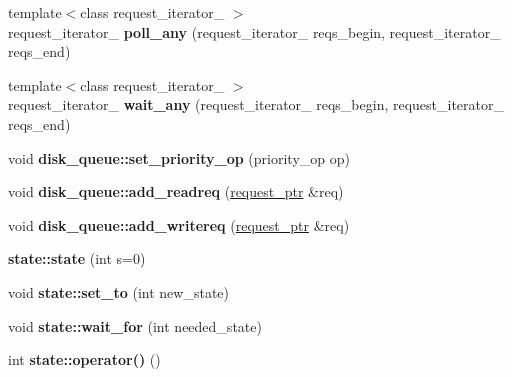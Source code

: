 \begin{CompactItemize}
\item 
\hypertarget{group__iolayer_g825e2ba95dc73579da11f2e1a86943fd}{
{\footnotesize template$<$class request\_\-iterator\_\- $>$ }\\request\_\-iterator\_\- \textbf{poll\_\-any} (request\_\-iterator\_\- reqs\_\-begin, request\_\-iterator\_\- reqs\_\-end)}
\label{group__iolayer_g825e2ba95dc73579da11f2e1a86943fd}

\item 
\hypertarget{group__iolayer_g2bfbfc0bc801311fd2933969ca786fef}{
{\footnotesize template$<$class request\_\-iterator\_\- $>$ }\\request\_\-iterator\_\- \textbf{wait\_\-any} (request\_\-iterator\_\- reqs\_\-begin, request\_\-iterator\_\- reqs\_\-end)}
\label{group__iolayer_g2bfbfc0bc801311fd2933969ca786fef}

\item 
\hypertarget{group__iolayer_g0f6ee4c3e136a93c4e06990df1eeb6ec}{
void \textbf{disk\_\-queue::set\_\-priority\_\-op} (priority\_\-op op)}
\label{group__iolayer_g0f6ee4c3e136a93c4e06990df1eeb6ec}

\item 
\hypertarget{group__iolayer_gde215c9825e46bba2da2b9bf268f4444}{
void \textbf{disk\_\-queue::add\_\-readreq} (\hyperlink{classrequest__ptr}{request\_\-ptr} \&req)}
\label{group__iolayer_gde215c9825e46bba2da2b9bf268f4444}

\item 
\hypertarget{group__iolayer_g56c08a05fdcfd529d6d815b5b464ccff}{
void \textbf{disk\_\-queue::add\_\-writereq} (\hyperlink{classrequest__ptr}{request\_\-ptr} \&req)}
\label{group__iolayer_g56c08a05fdcfd529d6d815b5b464ccff}

\item 
\hypertarget{group__iolayer_g7ca8a7fe6ff58423448c1445a038329a}{
\textbf{state::state} (int s=0)}
\label{group__iolayer_g7ca8a7fe6ff58423448c1445a038329a}

\item 
\hypertarget{group__iolayer_g9e50a96c9dd8f4d8d1049f74d98c8ac8}{
void \textbf{state::set\_\-to} (int new\_\-state)}
\label{group__iolayer_g9e50a96c9dd8f4d8d1049f74d98c8ac8}

\item 
\hypertarget{group__iolayer_gb69f0204f03a489f17028b321e9dd7d4}{
void \textbf{state::wait\_\-for} (int needed\_\-state)}
\label{group__iolayer_gb69f0204f03a489f17028b321e9dd7d4}

\item 
\hypertarget{group__iolayer_g7aea3cee181a4df5630222717a07db0a}{
int \textbf{state::operator()} ()}
\label{group__iolayer_g7aea3cee181a4df5630222717a07db0a}


\end{CompactItemize}
